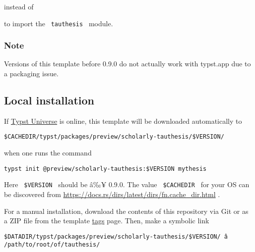 \begin{Shaded}
\begin{Highlighting}[]
\end{Highlighting}
\end{Shaded}

instead of

\begin{Shaded}
\begin{Highlighting}[]
\end{Highlighting}
\end{Shaded}

to import the \texttt{\ tauthesis\ } module.

\subsubsection{Note}\label{note}

Versions of this template before 0.9.0 do not actually work with
typst.app due to a packaging issue.

\subsection{Local installation}\label{local-installation}

If \href{https://typst.app/universe}{Typst Universe} is online, this
template will be downloaded automatically to

\begin{verbatim}
$CACHEDIR/typst/packages/preview/scholarly-tauthesis/$VERSION/
\end{verbatim}

when one runs the command

\begin{verbatim}
typst init @preview/scholarly-tauthesis:$VERSION mythesis
\end{verbatim}

Here \texttt{\ \$VERSION\ } should be â‰¥ 0.9.0. The value
\texttt{\ \$CACHEDIR\ } for your OS can be discovered from
\url{https://docs.rs/dirs/latest/dirs/fn.cache_dir.html} .

For a manual installation, download the contents of this repository via
Git or as a ZIP file from the template
\href{https://gitlab.com/tuni-official/thesis-templates/tau-typst-thesis-template/-/tags}{tags}
page. Then, make a symbolic link

\begin{verbatim}
$DATADIR/typst/packages/preview/scholarly-tauthesis/$VERSION/ â /path/to/root/of/tauthesis/
\end{verbatim}

